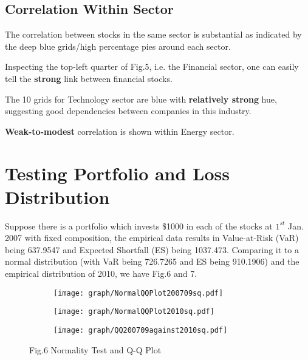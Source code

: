 \documentclass[11pt]{article}
\begin{document}
\subsection{Correlation Within Sector}\vspace{-1em}
The correlation between stocks in the same sector is substantial as indicated by the deep blue grids/high percentage pies around each sector. 
\begin{description}\vspace{-1em}
\item[Financial Sector] Inspecting the top-left quarter of Fig.5, i.e. the Financial sector, one can easily tell the \textbf{strong} link between financial stocks.
\item[Technology Sector] The 10 grids for Technology sector are blue with \textbf{relatively strong} hue, suggesting good dependencies between companies in this industry.
\item[Energy Sector] \textbf{Weak-to-modest} correlation is shown within Energy sector.
\end{description}
  

\section{Testing Portfolio and Loss Distribution}\vspace{-1em}
Suppose there is a portfolio which invests \$1000 in each of the stocks at $1^{st}$ Jan. 2007 with fixed composition, the empirical data results in Value-at-Risk (VaR) being 637.9547 and Expected Shortfall (ES) being 1037.473. Comparing it to a normal distribution (with VaR being 726.7265 and ES being 910.1906) and the empirical distribution of 2010, we have Fig.6 and 7.
\begin{figure}[h]
\begin{subfigure}{0.33\textwidth}
  \centering
  \texttt{[image: graph/NormalQQPlot200709sq.pdf]}
\end{subfigure}%
\begin{subfigure}{0.33\textwidth}
  \centering
  \texttt{[image: graph/NormalQQPlot2010sq.pdf]}
\end{subfigure}
\begin{subfigure}{0.33\textwidth}
  \centering
  \texttt{[image: graph/QQ200709against2010sq.pdf]}
\end{subfigure}
\centering Fig.6 Normality Test and Q-Q Plot
\end{figure}
\end{document}
